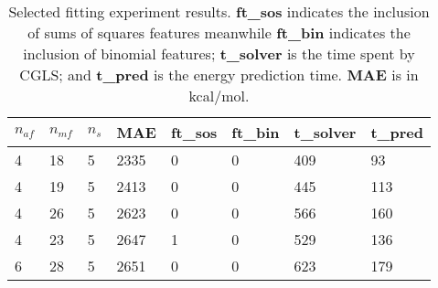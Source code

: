 \documentclass[12pt]{article}
\begin{document}
\begin{table}[H]
	\centering
	\caption{Selected fitting experiment results. \textbf{ft\_sos} indicates the inclusion of sums of squares features meanwhile \textbf{ft\_bin} indicates the inclusion of binomial features; \textbf{t\_solver} is the time spent by CGLS; and \textbf{t\_pred} is the energy prediction time. \textbf{MAE} is in kcal/mol.}
	\begin{tabular}{|l|l|l|l|l|l|l|l|}
		\hline
		\multicolumn{1}{|c|}{\textbf{$n_{af}$}} & \multicolumn{1}{c|}{\textbf{$n_{mf}$}} & \multicolumn{1}{c|}{\textbf{$n_s$}} &\multicolumn{1}{c|}{\textbf{MAE}} & \multicolumn{1}{c|}{\textbf{ft\_sos}} & \multicolumn{1}{c|}{\textbf{ft\_bin}} & \multicolumn{1}{c|}{\textbf{t\_solver}} & \multicolumn{1}{c|}{\textbf{t\_pred}} \\ \hline
		4                                    & 18                                  & 5                                      & 2335                        & 0                                     & 0                                     & 409                                   & 93                                  \\ \hline
		4                                    & 19                                  & 5                                      & 2413                        & 0                                     & 0                                     & 445                                   & 113                                 \\ \hline
		4                                    & 26                                  & 5                                      & 2623                        & 0                                     & 0                                     & 566                                   & 160                                 \\ \hline
		4                                    & 23                                  & 5                                      & 2647                        & 1                                     & 0                                     & 529                                   & 136                                 \\ \hline
		6                                    & 28                                  & 5                                      & 2651                        & 0                                     & 0                                     & 623                                   & 179                                 \\ \hline
	\end{tabular}
	\label{tab:shepard_exp}
\end{table}
\end{document}
